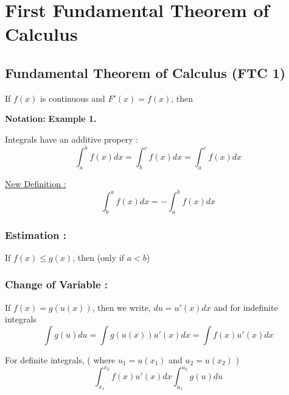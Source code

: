 

\chapter{First Fundamental Theorem of Calculus}
\bigbreak

\section{Fundamental Theorem of Calculus (FTC 1)}

\begin{mdframed}
\begin{center}
    If $f(x)$ is continuous and $F'(x) = f(x)$, then \\
\end{center}
\end{mdframed}

{\bf Notation: } 
\bigbreak
{\bf Example 1.}  
\bigbreak

Integrals have an additive propery : 
$$
    \int_a^b f(x) dx = \int_b^c f(x) dx = \int_a^c f(x) dx
$$

\underline{New Definition : }
$$
    \int_b^a f(x) dx = - \int_a^b f(x) dx
$$


\subsection{Estimation : }
If $f(x) \leq g(x)$, then  (only if $a < b$)

\subsection{Change of Variable : }
If $f(x) = g(u(x))$, then we write, $du = u'(x)dx$ and for indefinite integrals
$$ \int g(u) du = \int g(u(x)) u'(x) dx = \int f(x)u'(x)dx $$

For definite integrals, ( where $u_1 = u(x_1)$ and $u_2 = u(x_2)$ ) 
$$ \int_{x_1}^{x_2} f(x)u'(x)dx \int_{u_1}^{u_2} g(u) du $$
